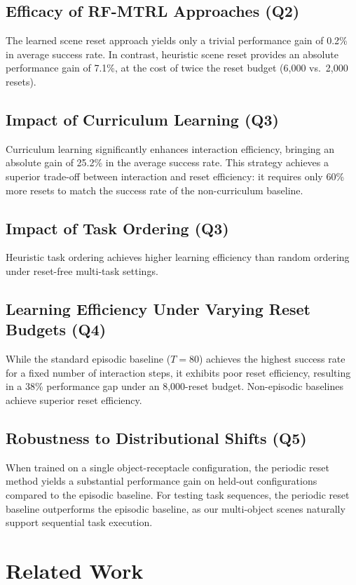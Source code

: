 \subsection{Efficacy of RF-MTRL Approaches (Q2)}
The learned scene reset approach yields only a trivial performance gain of 0.2\% in average success rate. In contrast, heuristic scene reset provides an absolute performance gain of 7.1\%, at the cost of twice the reset budget (6,000 vs.\ 2,000 resets).

\subsection{Impact of Curriculum Learning (Q3)}
Curriculum learning significantly enhances interaction efficiency, bringing an absolute gain of 25.2\% in the average success rate. This strategy achieves a superior trade-off between interaction and reset efficiency: it requires only 60\% more resets to match the success rate of the non-curriculum baseline.

\subsection{Impact of Task Ordering (Q3)}
Heuristic task ordering achieves higher learning efficiency than random ordering under reset-free multi-task settings.

\subsection{Learning Efficiency Under Varying Reset Budgets (Q4)}
While the standard episodic baseline ($T=80$) achieves the highest success rate for a fixed number of interaction steps, it exhibits poor reset efficiency, resulting in a 38\% performance gap under an 8,000-reset budget. Non-episodic baselines achieve superior reset efficiency.

\subsection{Robustness to Distributional Shifts (Q5)}
When trained on a single object-receptacle configuration, the periodic reset method yields a substantial performance gain on held-out configurations compared to the episodic baseline. For testing task sequences, the periodic reset baseline outperforms the episodic baseline, as our multi-object scenes naturally support sequential task execution.

\section{Related Work}

